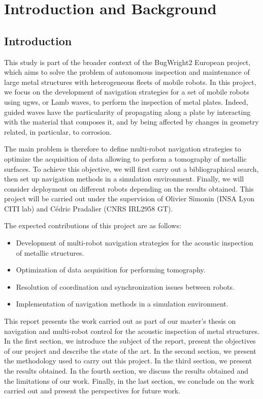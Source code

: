 
\chapter{Introduction and Background}

\section{Introduction}

This study is part of the broader context of the BugWright2 European project, which aims to solve the problem of autonomous inspection and maintenance of large metal structures with heterogeneous fleets of mobile robots.
In this project, we focus on the development of navigation strategies for a set of mobile robots using \gls{ugw}s, or Lamb waves, to perform the inspection of metal plates.
Indeed, guided waves have the particularity of propagating along a plate by interacting with the material that composes it, and by being affected by changes in geometry related, in particular, to corrosion.

The main problem is therefore to define multi-robot navigation strategies to optimize the acquisition of data allowing to perform a tomography of metallic surfaces.
To achieve this objective, we will first carry out a bibliographical search, then set up navigation methods in a simulation environment.
Finally, we will consider deployment on different robots depending on the results obtained.
This project will be carried out under the supervision of Olivier Simonin (INSA Lyon CITI lab) and Cédric Pradalier (CNRS IRL2958 GT).

The expected contributions of this project are as follows:
\begin{itemize}
	\item Development of multi-robot navigation strategies for the acoustic inspection of metallic structures.
	\item Optimization of data acquisition for performing tomography.
	\item Resolution of coordination and synchronization issues between robots.
	\item Implementation of navigation methods in a simulation environment.
\end{itemize}

This report presents the work carried out as part of our master's thesis on navigation and multi-robot control for the acoustic inspection of metal structures.
In the first section, we introduce the subject of the report, present the objectives of our project and describe the state of the art.
In the second section, we present the methodology used to carry out this project.
In the third section, we present the results obtained.
In the fourth section, we discuss the results obtained and the limitations of our work.
Finally, in the last section, we conclude on the work carried out and present the perspectives for future work.

